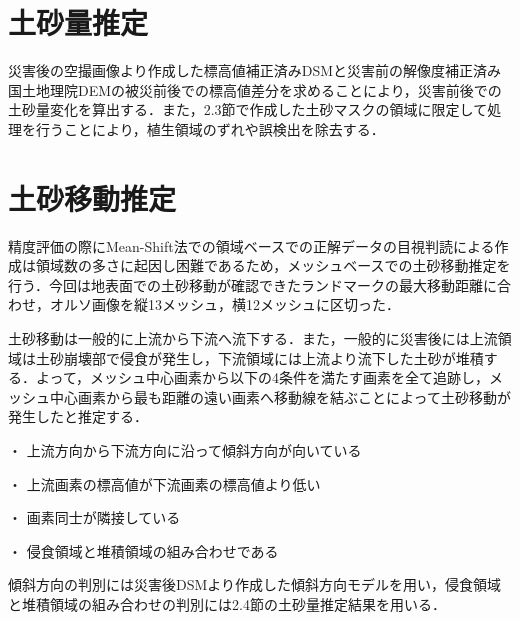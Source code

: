   
  \section{土砂量推定}
    災害後の空撮画像より作成した標高値補正済みDSMと災害前の解像度補正済み国土地理院DEMの被災前後での標高値差分を求めることにより，災害前後での土砂量変化を算出する．また，2.3節で作成した土砂マスクの領域に限定して処理を行うことにより，植生領域のずれや誤検出を除去する．
  

  \section{土砂移動推定}
    精度評価の際にMean-Shift法での領域ベースでの正解データの目視判読による作成は領域数の多さに起因し困難であるため，メッシュベースでの土砂移動推定を行う．今回は地表面での土砂移動が確認できたランドマークの最大移動距離に合わせ，オルソ画像を縦13メッシュ，横12メッシュに区切った．

    土砂移動は一般的に上流から下流へ流下する．また，一般的に災害後には上流領域は土砂崩壊部で侵食が発生し，下流領域には上流より流下した土砂が堆積する．よって，メッシュ中心画素から以下の4条件を満たす画素を全て追跡し，メッシュ中心画素から最も距離の遠い画素へ移動線を結ぶことによって土砂移動が発生したと推定する．

    ・	上流方向から下流方向に沿って傾斜方向が向いている

    ・	上流画素の標高値が下流画素の標高値より低い
    
    ・	画素同士が隣接している
    
    ・	侵食領域と堆積領域の組み合わせである

    傾斜方向の判別には災害後DSMより作成した傾斜方向モデルを用い，侵食領域と堆積領域の組み合わせの判別には2.4節の土砂量推定結果を用いる．
  

